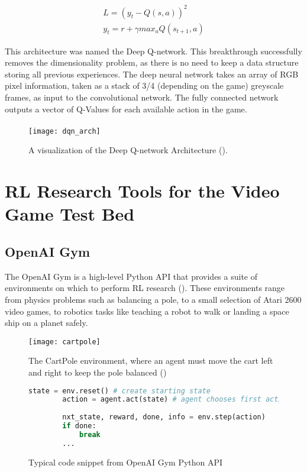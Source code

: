 \begin{align}
    L = (y_t - Q(s, a))^2 \label{equ:DQLoss} \\
    y_t = r + \gamma max_{a}Q(s_{t+1}, a) \label{equ:DQTarget}
\end{align}

This architecture was named the Deep Q-network. This breakthrough successfully removes the dimensionality problem, as there is no need to keep a data structure storing all previous experiences. The deep neural network takes an array of RGB pixel information, taken as a stack of 3/4 (depending on the game) greyscale frames, as input to the convolutional network. The fully connected network outputs a vector of Q-Values for each available action in the game. \paragraph{}

\begin{figure}[H]
    \centering
    \texttt{[image: dqn\_arch]}
    \caption{A visualization of the Deep Q-network Architecture (\citet{human}).}
\end{figure}

\section{RL Research Tools for the Video Game Test Bed}
\subsection{OpenAI Gym}
The OpenAI Gym is a high-level Python API that provides a suite of environments on which to perform RL research (\citet{openaigym}). These environments range from physics problems such as balancing a pole, to a small selection of Atari 2600 video games, to robotics tasks like teaching a robot to walk or landing a space ship on a planet safely.

\begin{figure}[H]
    \centering
    \texttt{[image: cartpole]}
    \caption{The CartPole environment, where an agent must move the cart left and right to keep the pole balanced (\citet{openaigym})}
\end{figure}

\begin{figure}[h]
    \centering
    \begin{lstlisting}[language=Python]
        state = env.reset() # create starting state
        action = agent.act(state) # agent chooses first action
        
        nxt_state, reward, done, info = env.step(action)
        if done:
            break
        ...
    \end{lstlisting}
    \caption{Typical code snippet from OpenAI Gym Python API}
\end{figure}

